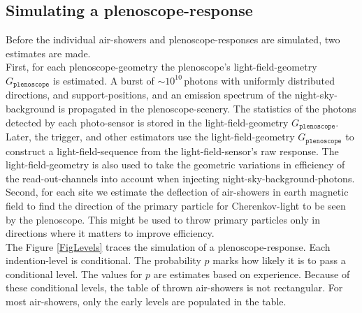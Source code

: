 \documentclass[a4paper,12pt,oneside]{article}
\begin{document}
\subsection{Simulating a plenoscope-response}
%
Before the individual air-showers and plenoscope-responses are simulated, two estimates are made.\\
%
First, for each plenoscope-geometry the plenoscope's light-field-geometry $G_\texttt{plenoscope}$ is estimated.
%
A burst of \mbox{$\sim 10^{10}$\,photons} with uniformly distributed directions, and support-positions, and an emission spectrum of the night-sky-background is propagated in the plenoscope-scenery.
%
The statistics of the photons detected by each photo-sensor is stored in the light-field-geometry $G_\texttt{plenoscope}$.
%
Later, the trigger, and other estimators use the light-field-geometry $G_\texttt{plenoscope}$ to construct a light-field-sequence from the light-field-sensor's raw response.
%
The light-field-geometry is also used to take the geometric variations in efficiency of the read-out-channels into account when injecting night-sky-background-photons.\\
%
Second, for each site we estimate the deflection of air-showers in earth magnetic field to find the direction of the primary particle for Cherenkov-light to be seen by the plenoscope.
%
This might be used to throw primary particles only in directions where it matters to improve efficiency.\\
%
The Figure \ref{FigLevels} traces the simulation of a plenoscope-response.
%
Each indention-level is conditional.
%
The probability $p$ marks how likely it is to pass a conditional level.
%
The values for $p$ are estimates based on experience.
%
Because of these conditional levels, the table of thrown air-showers is not rectangular.
%
For most air-showers, only the early levels are populated in the table.
%
\end{document}
